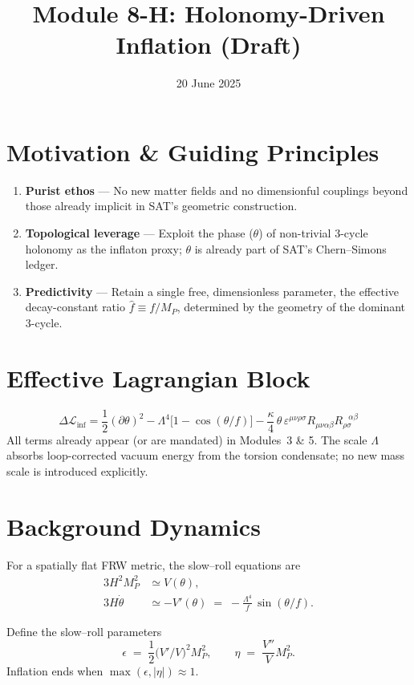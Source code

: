 \documentclass[12pt]{article}
\begin{document}
\title{Module 8-H: Holonomy-Driven Inflation (Draft)}
\date{20 June 2025}
\maketitle

\section{Motivation \& Guiding Principles}
\begin{enumerate}
    \item \textbf{Purist ethos} --- No new matter fields and no dimensionful couplings beyond those already implicit in SAT's geometric construction.
    \item \textbf{Topological leverage} --- Exploit the phase ($\theta$) of non-trivial 3-cycle holonomy as the inflaton proxy; $\theta$ is already part of SAT's Chern--Simons ledger.
    \item \textbf{Predictivity} --- Retain a single free, dimensionless parameter, the effective decay-constant ratio $\hat f \equiv f/M_P$, determined by the geometry of the dominant 3-cycle.
\end{enumerate}

\section{Effective Lagrangian Block}
\[
\Delta\mathcal{L}_{\text{inf}} = \frac12 (\partial \theta)^2 - \Lambda^4 \bigl[1 - \cos(\theta/f)\bigr] - \frac{\kappa}{4}\,\theta\,\varepsilon^{\mu\nu\rho\sigma} R_{\mu\nu\alpha\beta} R_{\rho\sigma}^{\;\;\,\alpha\beta}
\]
All terms already appear (or are mandated) in Modules~3 \& 5. The scale $\Lambda$ absorbs loop-corrected vacuum energy from the torsion condensate; no new mass scale is introduced explicitly.

\section{Background Dynamics}
For a spatially flat FRW metric, the slow–roll equations are
\begin{align}
3H^2 M_P^2 &\simeq V(\theta),\\
3H\dot{\theta} &\simeq -V'(\theta) \;=\; -\frac{\Lambda^4}{f}\,\sin(\theta/f).
\end{align}

Define the slow--roll parameters
\[
\epsilon \;=\; \frac12 \bigl(V'/V\bigr)^2 M_P^2,
\qquad
\eta \;=\; \frac{V''}{V} M_P^2.
\]
Inflation ends when $\max(\epsilon,|\eta|)\approx1$.
\end{document}
